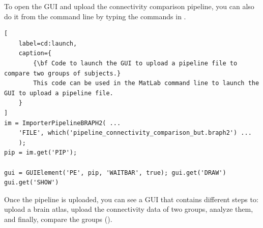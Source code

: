 \documentclass[justified]{tufte-handout}
\begin{document}
\begin{tcolorbox}[
	title=Pipeline launch from command line
]
To open the GUI and upload the connectivity comparison pipeline, you can also do it from the command line by typing the commands in .
%
\begin{lstlisting}[
	label=cd:launch,
	caption={
		{\bf Code to launch the GUI to upload a pipeline file to compare two groups of subjects.}
		This code can be used in the MatLab command line to launch the GUI to upload a pipeline file.
	}
]
im = ImporterPipelineBRAPH2( ...
	'FILE', which('pipeline_connectivity_comparison_but.braph2') ...
	);
pip = im.get('PIP');

gui = GUIElement('PE', pip, 'WAITBAR', true); gui.get('DRAW')
gui.get('SHOW')
\end{lstlisting}
\end{tcolorbox}

Once the pipeline is uploaded, you can see a GUI that contains different steps to: upload a brain atlas, upload the connectivity data of two groups, analyze them, and finally, compare the groups (). 
\end{document}
